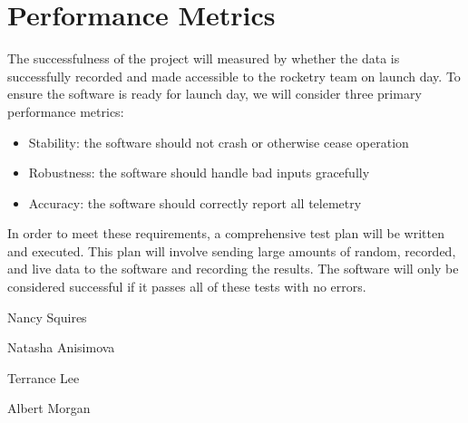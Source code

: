 \documentclass[10pt,journal,draftclsnofoot,onecolumn]{IEEEtran}
\begin{document}
	\section{Performance Metrics}
	
	The successfulness of the project will measured by whether the data
	is successfully recorded and made accessible to the rocketry team
	on launch day. To ensure the software is ready for launch day,
	we will consider three primary performance metrics:
	
	\begin{itemize}
		\item Stability: the software should not crash or otherwise cease operation
		\item Robustness: the software should handle bad inputs gracefully
		\item Accuracy: the software should correctly report all telemetry
	\end{itemize}
	
	In order to meet these requirements, a comprehensive test plan will
	be written and executed. This plan will involve sending large amounts
	of random, recorded, and live data to the software and recording the results.
	The software will only be considered successful if it passes all of these
	tests with no errors.

	\vspace{1in}
	\noindent Nancy Squires

	\vspace{1in}
	\noindent Natasha Anisimova

	\vspace{1in}
	\noindent Terrance Lee

	\vspace{1in}
	\noindent Albert Morgan\\
	
\end{document}

